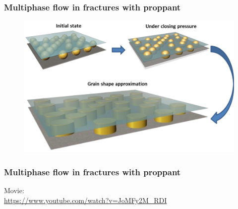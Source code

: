 \documentclass[10pt,handout]{beamer}
\begin{document}
\begin{frame}\frametitle{Multiphase flow in fractures with proppant}
\begin{center}
\begin{figure}
\includegraphics[width = 1 \textwidth]{obrazki_md/2.png} 
\end{figure}
\end{center}
\end{frame}


\begin{frame}\frametitle{Multiphase flow in fractures with proppant}
\begin{center}
Movie: \\
\vspace{1em}
\url{https://www.youtube.com/watch?v=JoMFy2M_RDI }
\end{center}
\end{frame}
\end{document}
